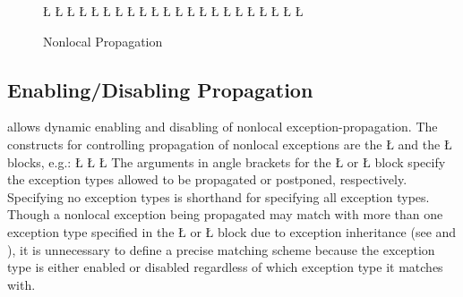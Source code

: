 \documentclass[openright,twoside]{report}
\begin{document}
\begin{figure}[htb]
\LGinlinefalse\LGbegin\lgrinde
\L{}
\L{\LB{}}
\L{}
\L{\LB{}}
\L{\LB{}}
\L{\LB{}}
\CE{}\L{\LB{}}
\L{\LB{}}
\L{\LB{}}
\L{\LB{}}
\L{\LB{}}
\L{\LB{}}
\L{}
\L{\LB{}}
\L{\LB{\};}}
\L{\LB{}}
\L{}
\L{\LB{}}
\L{\LB{}}
\L{\LB{}}
\CE{}\L{\LB{}}
\CE{}\L{\LB{\}}}
\endlgrinde\LGend
\vspace{-4mm}
\caption{Nonlocal Propagation}
\label{f:NonlocalPropagation}
\end{figure}


\subsection{Enabling/Disabling Propagation}
\label{s:EnablingDisablingPropagation}

\uC allows dynamic enabling and disabling of nonlocal exception-propagation.
The constructs for controlling propagation of nonlocal exceptions are the \LGinlinetrue\LGbegin\lgrinde\L{}\endlgrinde\LGend{} and the \LGinlinetrue\LGbegin\lgrinde\L{}\endlgrinde\LGend{} blocks, e.g.:
\LGinlinefalse\LGbegin\lgrinde
\L{}
\L{\LB{}}
\CE{}\L{\LB{\}}}
\endlgrinde\LGend
The arguments in angle brackets for the \LGinlinetrue\LGbegin\lgrinde\L{}\endlgrinde\LGend{} or \LGinlinetrue\LGbegin\lgrinde\L{}\endlgrinde\LGend{} block specify the exception types allowed to be propagated or postponed, respectively.
Specifying no exception types is shorthand for specifying all exception types.
Though a nonlocal exception being propagated may match with more than one exception type specified in the \LGinlinetrue\LGbegin\lgrinde\L{}\endlgrinde\LGend{} or \LGinlinetrue\LGbegin\lgrinde\L{}\endlgrinde\LGend{} block due to exception inheritance (see  and ), it is unnecessary to define a precise matching scheme because the exception type is either enabled or disabled regardless of which exception type it matches with.
\end{document}
